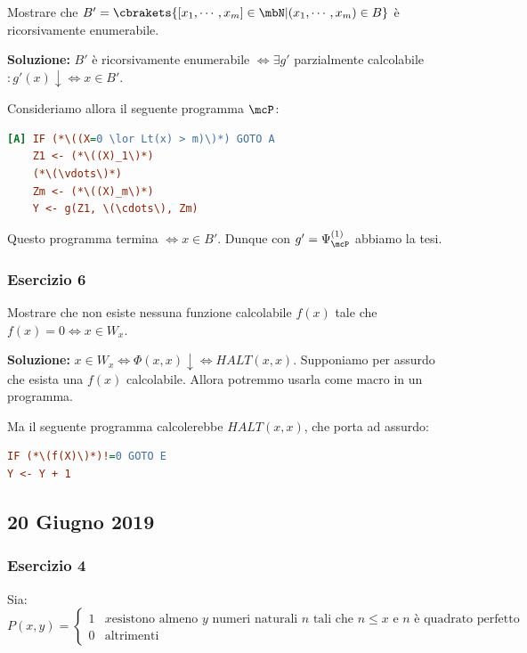 Mostrare che \(B'=\cbrakets{[x_1, \cdots, x_m] \in \mbN\vert (x_1, \cdots, x_m) \in B}\) è ricorsivamente enumerabile.

\textbf{Soluzione:} \(B'\) è ricorsivamente enumerabile \(\iff \exists g'\) parzialmente calcolabile \(: g'(x) \downarrow \iff x \in B'\).

Consideriamo allora il seguente programma \(\mcP\):

\begin{lstlisting}[language=ini, caption={ }]
[A] IF (*\((X=0 \lor Lt(x) > m)\)*) GOTO A
    Z1 <- (*\((X)_1\)*)
    (*\(\vdots\)*)
    Zm <- (*\((X)_m\)*)
    Y <- g(Z1, \(\cdots\), Zm)
\end{lstlisting}

Questo programma termina \(\iff x \in B'\). Dunque con \(g'=\Psi_{\mcP}^{(1)}\) abbiamo la tesi.

\subsubsection{Esercizio 6}

Mostrare che non esiste nessuna funzione calcolabile \(f(x)\) tale che \(f(x)=0 \iff x \in W_x\).

\textbf{Soluzione:} \(x \in W_x \iff \Phi(x,x) \downarrow \iff \textit{HALT}(x,x)\). Supponiamo per assurdo che esista una \(f(x)\) calcolabile. Allora potremmo usarla come macro in un programma.

Ma il seguente programma calcolerebbe \(\textit{HALT}(x,x)\), che porta ad assurdo:

\begin{lstlisting}[language=ini, caption={ }]
IF (*\(f(X)\)*)!=0 GOTO E
Y <- Y + 1
\end{lstlisting}

\subsection{20 Giugno 2019}

\subsubsection{Esercizio 4}

Sia:
\begin{equation}
  P(x,y)=\begin{cases}
    1 & x \text{esistono almeno } y \text{ numeri naturali } n \text{ tali che } n\leq x \text{ e } n \text { è quadrato perfetto}\\
    0 & \text{altrimenti}
  \end{cases}
\end{equation}

